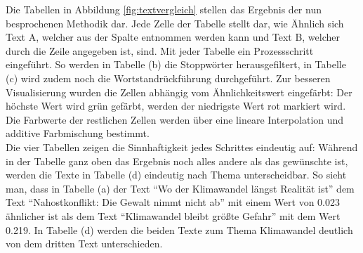 Die Tabellen in Abbildung \ref{fig:textvergleich} stellen das Ergebnis der nun besprochenen Methodik dar. Jede Zelle der Tabelle stellt dar, wie Ähnlich sich Text A, welcher aus der Spalte entnommen werden kann und Text B, welcher durch die Zeile angegeben ist, sind. Mit jeder Tabelle ein Prozessschritt eingeführt. So werden in Tabelle (b) die Stoppwörter herausgefiltert, in Tabelle (c) wird zudem noch die Wortstandrückführung durchgeführt. Zur besseren Visualisierung wurden die Zellen abhängig vom Ähnlichkeitswert eingefärbt: Der höchste Wert wird grün gefärbt, werden der niedrigste Wert rot markiert wird. Die Farbwerte der restlichen Zellen werden über eine lineare Interpolation und additive Farbmischung bestimmt.\\ \newline
Die vier Tabellen zeigen die Sinnhaftigkeit jedes Schrittes eindeutig auf: Während in der Tabelle ganz oben das Ergebnis noch alles andere als das gewünschte ist, werden die Texte in Tabelle (d) eindeutig nach Thema unterscheidbar. So sieht man, dass  in Tabelle (a)  der Text "`Wo der Klimawandel längst Realität ist"' dem Text "`Nahostkonflikt: Die Gewalt nimmt nicht ab"' mit einem Wert von 0.023 ähnlicher ist als dem Text "`Klimawandel bleibt größte Gefahr"' mit dem Wert 0.219. In Tabelle (d) werden die beiden Texte zum Thema Klimawandel deutlich von dem dritten Text unterschieden. 
